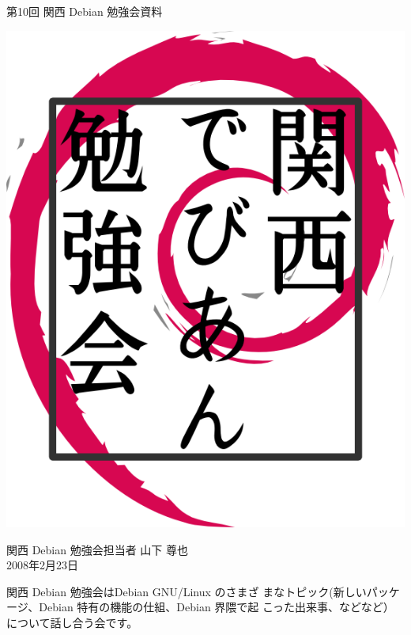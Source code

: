 \documentclass[mingoth,a4paper]{jsarticle}
\newcommand{\debmtgyear}{2008}
\newcommand{\debmtgdate}{23}
\newcommand{\debmtgmonth}{2}
\newcommand{\debmtgnumber}{10}
\begin{document}
\begin{titlepage}


 第\debmtgnumber{}回 関西 Debian 勉強会資料

\vspace{2cm}

\begin{center}
\includegraphics{image200802/kansaidebianlogo.png}
\end{center}

\begin{flushright}
\hfill{}関西 Debian 勉強会担当者 山下 尊也\\
\hfill{}\debmtgyear{}年\debmtgmonth{}月\debmtgdate{}日
\end{flushright}

\thispagestyle{empty}
\end{titlepage}

 
 関西 Debian 勉強会はDebian GNU/Linux のさまざ
 まなトピック(新しいパッケージ、Debian 特有の機能の仕組、Debian 界隈で起
 こった出来事、などなど）について話し合う会です。
\end{document}

